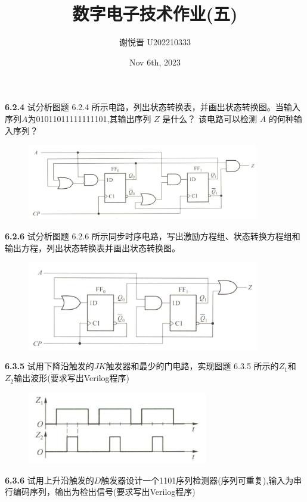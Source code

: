\documentclass[a4paper,11pt,UTF8]{article}
\title{数字电子技术作业(五)}
\author{谢悦晋 \quad U202210333}
\date{Nov 6th, 2023 }
\begin{document}
\maketitle
\textbf{6.2.4} 试分析图题 6.2.4 所示电路，列出状态转换表，并画出状态转换图。当输入序列$A$为01011011111111101,其输出序列 $Z$ 是什么？ 该电路可以检测 $A$ 的何种输入序列？
\begin{figure}[H]
	\centering
	\includegraphics[width=0.9\textwidth]{6.2.4}
\end{figure}
\textbf{6.2.6} 试分析图题 6.2.6 所示同步时序电路，写出激励方程组、状态转换方程组和输出方程，列出状态转换表并画出状态转换图。
\begin{figure}[H]
	\centering
	\includegraphics[width=0.9\textwidth]{6.2.6}
\end{figure}
\textbf{6.3.5} 试用下降沿触发的$JK$触发器和最少的门电路，实现图题 6.3.5 所示的$Z_{1}$和$Z_{2}$输出波形(要求写出Verilog程序)
\begin{figure}[H]
	\centering
	\includegraphics[width=0.7\textwidth]{6.3.5}
\end{figure}
\textbf{6.3.6} 试用上升沿触发的$D$触发器设计一个1101序列检测器(序列可重复),输入为串行编码序列，输出为检出信号(要求写出Verilog程序)
\end{document}
